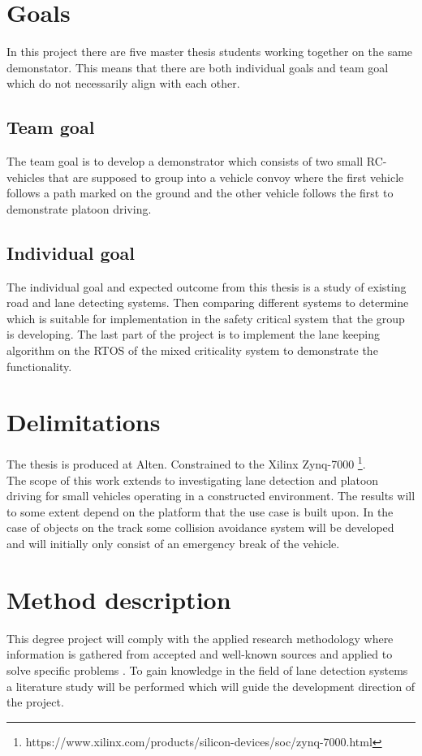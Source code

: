 \section{Goals}
In this project there are five master thesis students working together on the same demonstator. This means that there are both individual goals and team goal which do not necessarily align with each other.

\subsection{Team goal}
The team goal is to develop a demonstrator which consists of two small RC-vehicles that are supposed to group into a vehicle convoy where the first vehicle follows a path marked on the ground and the other vehicle follows the first to demonstrate platoon driving.

\subsection{Individual goal}
The individual goal and expected outcome from this thesis is a study of existing road and lane detecting systems. Then comparing different systems to determine which is suitable for implementation in the safety critical system that the group is developing. The last part of the project is to implement the lane keeping algorithm on the RTOS of the mixed criticality system to demonstrate the functionality.

\section{Delimitations}
The thesis is produced at Alten. Constrained to the Xilinx Zynq-7000 \footnote{https://www.xilinx.com/products/silicon-devices/soc/zynq-7000.html}.\\

The scope of this work extends to investigating lane detection and platoon driving for small vehicles operating in a constructed environment. The results will to some extent depend on the platform that the use case is built upon. In the case of objects on the track some collision avoidance system will be developed and will initially only consist of an emergency break of the vehicle.

\section{Method description}
This degree project will comply with the applied research methodology where information is gathered from accepted and well-known sources and applied to solve specific problems \cite{haakansson2013portal}. To gain knowledge in the field of lane detection systems a literature study will be performed which will guide the development direction of the project.\\

